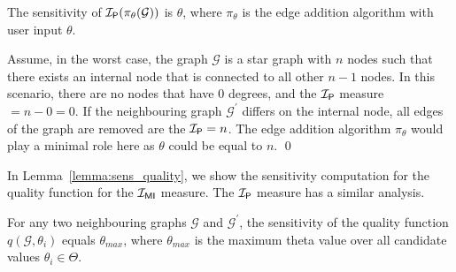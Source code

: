 {\begin{lemma}
    The sensitivity of $\mathcal{I_\mathsf{P}}(\pi_\theta(\mathcal{G}))$ is $\theta$, where $\pi_\theta$ is the edge addition algorithm with user input $\theta$.
    \label{lemma:sens_problematic}
\end{lemma}

\proof
Assume, in the worst case, the graph $\mathcal{G}$ is a star graph with $n$ nodes such that there exists an internal node that is connected to all other $n-1$ nodes. In this scenario, there are no nodes that have 0 degrees, and the $\mathcal{I_\mathsf{P}}$ measure $= n-0 = 0$. If the neighbouring graph $\mathcal{G}^\prime$ differs on the internal node, all edges of the graph are removed are the $\mathcal{I_\mathsf{P}} = n$. The edge addition algorithm $\pi_\theta$ would play a minimal role here as $\theta$ could be equal to $n$.
\qed




In Lemma~\ref{lemma:sens_quality}, we show the sensitivity computation for the quality function for the $\mathcal{I_{\mathsf{MI}}}$ measure. The $\mathcal{I_\mathsf{P}}$ measure has a similar analysis. 

\begin{lemma}
    For any two neighbouring graphs $\mathcal{G}$ and $\mathcal{G}^\prime$, the sensitivity of the quality function $q(\mathcal{G}, \theta_i)$ equals $\theta_{max}$,
    where $\theta_{max}$ is the maximum theta value over all candidate values $\theta_i \in \Theta$.
\end{lemma}\label{lemma:sens_quality}
}


